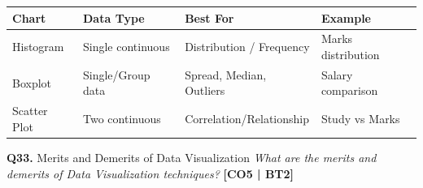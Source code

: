 \documentclass[12pt,a4paper]{article}
\newcommand{\Qno}[1]{\textbf{\color{darkred}Q#1.}}
\begin{document}
\begin{answerenv}
\begin{center}
\begin{tabular}{llll}
\toprule
\textbf{Chart} & \textbf{Data Type} & \textbf{Best For} & \textbf{Example} \\
\midrule
Histogram & Single continuous & Distribution / Frequency & Marks distribution \\
Boxplot & Single/Group data & Spread, Median, Outliers & Salary comparison \\
Scatter Plot & Two continuous & Correlation/Relationship & Study vs Marks \\
\bottomrule
\end{tabular}
\end{center}

\end{answerenv}

\vspace{8pt}

\begin{questionbox}{\Qno{33} Merits and Demerits of Data Visualization}
\textit{What are the merits and demerits of Data Visualization techniques?} \hfill \textbf{[CO5 | BT2]}
\end{questionbox}
\end{document}
